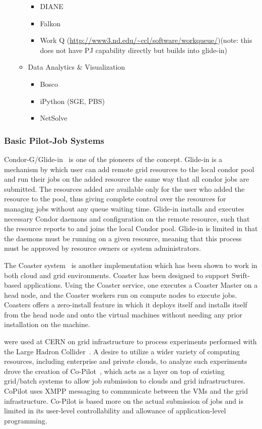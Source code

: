 \documentclass{sig-alternate}
\begin{document}
\begin{itemize}
\begin{itemize}
\begin{itemize}
			\item DIANE
			\item Falkon 
            \item Work Q (\url{http://www3.nd.edu/~ccl/software/workqueue/})(note: this does not have PJ capability directly but builds into glide-in)
		\end{itemize}
		\item Data Analytics \& Visualization
		\begin{itemize}
			\item Bosco
			\item iPython (SGE, PBS)
			\item NetSolve~\cite{Casanova:1995:NNS:898848}
		\end{itemize}		
	\end{itemize}
\end{itemize}

\subsubsection{Basic Pilot-Job Systems}
Condor-G/Glide-in~\cite{condor-g} is one of the pioneers of the \pilotjob
concept. Glide-in is a mechanism by which user can add remote grid resources
to the local condor pool and run their jobs on the added resource the same way
that all condor jobs are submitted. The resources added are available only for
the user who added the resource to the pool, thus giving complete control over
the resources for managing jobs without any queue waiting time. Glide-in
installs and executes necessary Condor daemons and configuration on the remote
resource, such that the resource reports to and joins the local Condor pool.
Glide-in is limited in that the daemons must be running on a given resource,
meaning that this process must be approved by resource owners or system
administrators.

The Coaster system~\cite{coasters} is another \pilotjob implementation
which has been shown to work in both cloud and grid
environments. Coaster has been designed to support Swift-based applications. Using the Coaster service, one executes a Coaster Master
on a head node, and the Coaster workers run on compute nodes to
execute jobs. Coasters offers a zero-install feature in which it
deploys itself and installs itself from the head node and onto the
virtual machines without needing any prior installation on the
machine. 

\pilotjobs were used at CERN on grid infrastructure to process experiments 
performed with the Large Hadron Collider~\cite{copilot-tr}. 
A desire to utilize a wider variety of computing resources, including 
enterprise and private clouds, to analyze such experiments drove the creation 
of Co-Pilot~\cite{copilot-tr}, which acts as a layer on top of existing
grid/batch systems to allow job submission to clouds and grid infrastructures. 
CoPilot uses XMPP messaging to communicate between the VMs and the grid 
infrastructure. Co-Pilot is based more on the actual
submission of jobs and is limited in its user-level controllability and 
allowance of application-level programming.
\end{document}
